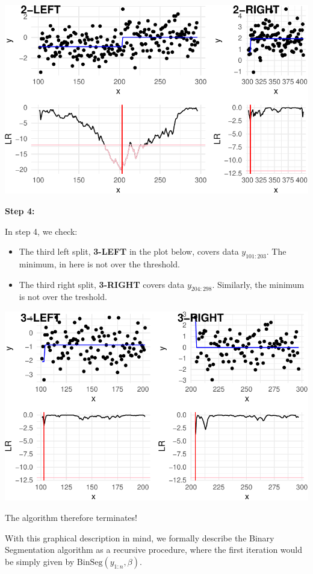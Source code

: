 \documentclass[
  letterpaper,
  DIV=11,
  numbers=noendperiod]{scrreprt}
\begin{document}
\includegraphics{3_multiple_changes_files/figure-pdf/unnamed-chunk-10-1.pdf}

\textbf{Step 4:}

In step 4, we check:

\begin{itemize}
\item
  The third left split, \textbf{3-LEFT} in the plot below, covers data
  \(y_{101:203}\). The minimum, in here is not over the threshold.
\item
  The third right split, \textbf{3-RIGHT} covers data \(y_{204:298}\).
  Similarly, the minimum is not over the treshold.
\end{itemize}

\includegraphics{3_multiple_changes_files/figure-pdf/unnamed-chunk-11-1.pdf}

The algorithm therefore terminates!

With this graphical description in mind, we formally describe the Binary
Segmentation algorithm as a recursive procedure, where the first
iteration would be simply given by \(\text{BinSeg}(y_{1:n}, \beta)\).
\end{document}
